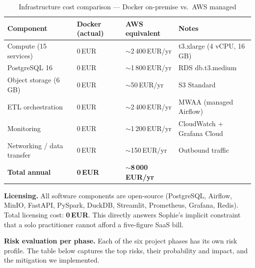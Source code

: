\documentclass[a4paper,11pt,oneside,openany]{report}
\begin{document}
\begin{table}[H]
\centering
\caption{Infrastructure cost comparison --- Docker on-premise vs.\ AWS managed}
\label{tab:capex}
\begin{tabularx}{\textwidth}{L{4cm} C{2.5cm} C{2.5cm} L{3.5cm}}
\toprule
\textbf{Component} & \textbf{Docker (actual)} & \textbf{AWS equivalent} & \textbf{Notes} \\
\midrule
Compute (15 services) & 0\,EUR & $\sim$2\,400\,EUR/yr & t3.xlarge (4 vCPU, 16\,GB) \\
PostgreSQL 16 & 0\,EUR & $\sim$1\,800\,EUR/yr & RDS db.t3.medium \\
Object storage (6\,GB) & 0\,EUR & $\sim$50\,EUR/yr & S3 Standard \\
ETL orchestration & 0\,EUR & $\sim$2\,400\,EUR/yr & MWAA (managed Airflow) \\
Monitoring & 0\,EUR & $\sim$1\,200\,EUR/yr & CloudWatch + Grafana Cloud \\
Networking / data transfer & 0\,EUR & $\sim$150\,EUR/yr & Outbound traffic \\
\midrule
\textbf{Total annual} & \textbf{0\,EUR} & \textbf{$\sim$8\,000\,EUR/yr} & \\
\bottomrule
\end{tabularx}
\end{table}

\textbf{Licensing.} All software components are open-source
(PostgreSQL, Airflow, MinIO, FastAPI, PySpark, DuckDB, Streamlit,
Prometheus, Grafana, Redis). Total licensing cost:
\textbf{0\,EUR}. This directly answers Sophie's implicit constraint
that a solo practitioner cannot afford a five-figure SaaS bill.

\textbf{Risk evaluation per phase.} Each of the six project phases
has its own risk profile. The table below captures the top risks,
their probability and impact, and the mitigation we implemented.
\end{document}
